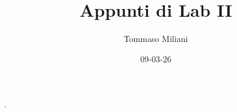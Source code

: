\documentclass[a4paper, oneside]{article}
\title{Appunti di Lab II}
\author{Tommaso Miliani}
\date{09-03-26}
\begin{document}
                {}          %
                {}          %
                {\slshape}  %
                {}          %
                {\bfseries} %
                {.}         %
                {\newline}  %
                {}          %
\theoremstyle{theoremEnv}

\newtheorem{definition}{Definizione}[section]
\newtheorem{theorem}{Teorema}[section]
\newtheorem{lemma}{Proposizione}[section]
\newtheorem{observation}{Osservazione}[section]
\newtheorem{corollary}{Corollario}[theorem]
\newtheorem{example}{Esempio}[section]
\newtheorem{remark}{Enunciato}[section]

\maketitle
\end{document}
